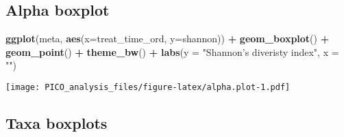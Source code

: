 \documentclass[]{article}
\newenvironment{Shaded}{\begin{snugshade}}{\end{snugshade}}
\newcommand{\KeywordTok}[1]{\textcolor[rgb]{0.13,0.29,0.53}{\textbf{#1}}}
\newcommand{\DataTypeTok}[1]{\textcolor[rgb]{0.13,0.29,0.53}{#1}}
\newcommand{\StringTok}[1]{\textcolor[rgb]{0.31,0.60,0.02}{#1}}
\newcommand{\OperatorTok}[1]{\textcolor[rgb]{0.81,0.36,0.00}{\textbf{#1}}}
\newcommand{\NormalTok}[1]{#1}
\begin{document}
\subsection{Alpha boxplot}\label{alpha-boxplot}

\begin{Shaded}
\begin{Highlighting}[]
\KeywordTok{ggplot}\NormalTok{(meta, }\KeywordTok{aes}\NormalTok{(}\DataTypeTok{x=}\NormalTok{treat_time_ord, }\DataTypeTok{y=}\NormalTok{shannon)) }\OperatorTok{+}
\StringTok{  }\KeywordTok{geom_boxplot}\NormalTok{() }\OperatorTok{+}
\StringTok{  }\KeywordTok{geom_point}\NormalTok{() }\OperatorTok{+}
\StringTok{  }\KeywordTok{theme_bw}\NormalTok{() }\OperatorTok{+}
\StringTok{  }\KeywordTok{labs}\NormalTok{(}\DataTypeTok{y =} \StringTok{"Shannon's diveristy index"}\NormalTok{, }\DataTypeTok{x =} \StringTok{""}\NormalTok{)}
\end{Highlighting}
\end{Shaded}

\texttt{[image: PICO\_analysis\_files/figure-latex/alpha.plot-1.pdf]}

\subsection{Taxa boxplots}\label{taxa-boxplots}
\end{document}
